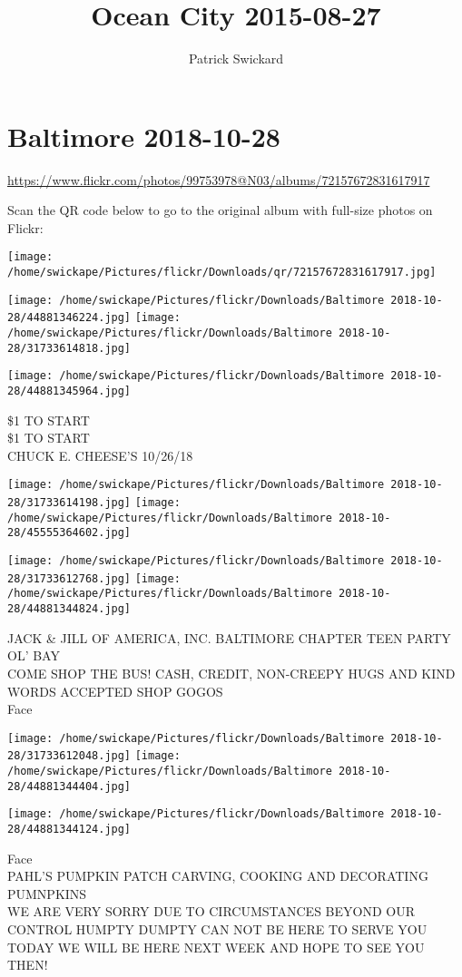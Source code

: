 \documentclass[10pt,letterpaper]{article}
\title{Ocean City 2015-08-27}
\author{Patrick Swickard}
\date{}
\begin{document}
\section*{Baltimore 2018-10-28}

\url{https://www.flickr.com/photos/99753978@N03/albums/72157672831617917}

Scan the QR code below to go to the original album with full-size photos on Flickr:

\texttt{[image: /home/swickape/Pictures/flickr/Downloads/qr/72157672831617917.jpg]}
\pagebreak

\texttt{[image: /home/swickape/Pictures/flickr/Downloads/Baltimore 2018-10-28/44881346224.jpg]}
\texttt{[image: /home/swickape/Pictures/flickr/Downloads/Baltimore 2018-10-28/31733614818.jpg]}

\vspace{0.25in}
\texttt{[image: /home/swickape/Pictures/flickr/Downloads/Baltimore 2018-10-28/44881345964.jpg]}

\$1 TO START\\
\$1 TO START\\
CHUCK E. CHEESE'S 10/26/18
\pagebreak

\texttt{[image: /home/swickape/Pictures/flickr/Downloads/Baltimore 2018-10-28/31733614198.jpg]}
\texttt{[image: /home/swickape/Pictures/flickr/Downloads/Baltimore 2018-10-28/45555364602.jpg]}

\texttt{[image: /home/swickape/Pictures/flickr/Downloads/Baltimore 2018-10-28/31733612768.jpg]}
\texttt{[image: /home/swickape/Pictures/flickr/Downloads/Baltimore 2018-10-28/44881344824.jpg]}

JACK \& JILL OF AMERICA, INC. BALTIMORE CHAPTER TEEN PARTY\\
OL' BAY\\
COME SHOP THE BUS!  CASH, CREDIT, NON{-}CREEPY HUGS AND KIND WORDS ACCEPTED SHOP GOGOS\\
Face
\pagebreak

\texttt{[image: /home/swickape/Pictures/flickr/Downloads/Baltimore 2018-10-28/31733612048.jpg]}
\texttt{[image: /home/swickape/Pictures/flickr/Downloads/Baltimore 2018-10-28/44881344404.jpg]}

\texttt{[image: /home/swickape/Pictures/flickr/Downloads/Baltimore 2018-10-28/44881344124.jpg]}

Face\\
PAHL'S PUMPKIN PATCH CARVING, COOKING AND DECORATING PUMNPKINS\\
WE ARE VERY SORRY DUE TO CIRCUMSTANCES BEYOND OUR CONTROL HUMPTY DUMPTY CAN NOT BE HERE TO SERVE YOU TODAY WE WILL BE HERE NEXT WEEK AND HOPE TO SEE YOU THEN!
\pagebreak
\end{document}
